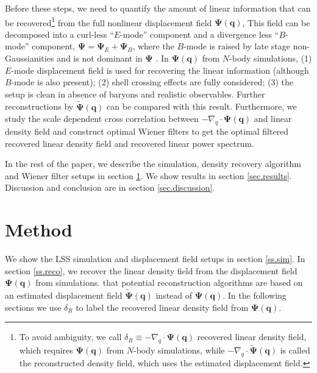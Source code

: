 \documentclass[aps,prd,twocolumn,superscriptaddress,amsfont,amssymb,amsmath,nofootinbib,showpacs,balancelastpage]{revtex4-1}
\newcommand{\bs}{\boldsymbol}
\begin{document}
Before these steps, we need to quantify the amount of linear information
that can be recovered\footnote{To avoid ambiguity, we call
$\delta_R\equiv-\nabla_q\cdot\bs\Psi(\bs q)$ recovered linear density field, which
requires $\bs\Psi(\bs q)$ from $N$-body simulations, while
$-\nabla_q\cdot\tilde{\bs \Psi}(\bs q)$ is called the
reconstructed density field, which uses the estimated displacement field.}
from the full nonlinear displacement field $\bs\Psi(\bs q)$,
This field can be decomposed into a curl-less ``$E$-mode'' component
and a divergence less ``$B$-mode'' component, $\bs\Psi=\bs\Psi_E+\bs\Psi_B$,
where the $B$-mode is raised by late stage non-Gaussianities and is not
dominant in $\bs\Psi$ \citep{2014PhRvD..89h3515C}.
In $\bs\Psi(\bs q)$ from $N$-body simulations,
(1) $E$-mode displacement field is used for recovering the linear information
(although $B$-mode is also present); (2) shell crossing effects are fully considered;
(3) the setup is clean in absence of baryons and realistic
observables. Further reconstructions by $\tilde{\bs \Psi}(\bs q)$
can be compared with this result.
Furthermore, we study the scale dependent cross correlation
between $-\nabla_q\cdot\bs\Psi(\bs q)$ and linear density field
and construct optimal Wiener filters to get the optimal filtered
recovered linear density field and recovered linear power spectrum.

In the rest of the paper, we describe the simulation,
density recovery algorithm and Wiener filter setups in section
\ref{sec.method}. We show results in section \ref{sec.results}.
Discussion and conclusion are in section \ref{sec.discussion}.


\section{Method}\label{sec.method}
We show the LSS simulation and displacement field setups in section \ref{ss.sim}.
In section \ref{ss.reco}, we recover the linear density field from the
displacement field $\bs\Psi(\bs q)$ from simulations.
 that potential reconstruction algorithms are
based on an estimated displacement field $\tilde{\bs \Psi}(\bs q)$
instead of $\bs\Psi(\bs q)$. In the following sections we
use $\delta_R$ to label the recovered linear density field
from $\bs\Psi(\bs q)$.
\end{document}
